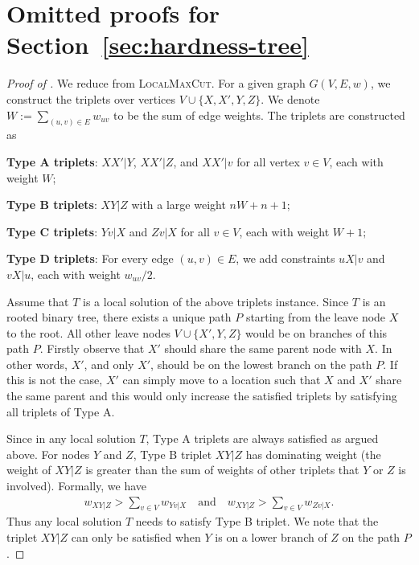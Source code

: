 \documentclass{article}
\theoremstyle{definition}  %
\theoremstyle{plain}
\numberwithin{observation}{section}
\numberwithin{claim}{section}
\numberwithin{fact}{section}
\numberwithin{lemma}{section}
\numberwithin{proposition}{section}
\numberwithin{theorem}{section}
\numberwithin{corollary}{section}
\numberwithin{definition}{section}
\newcommand{\Triplets}{\textsc{Local Triplets}}
\theoremstyle{plain}
\begin{document}
\section{Omitted proofs for Section~\ref{sec:hardness-tree}} \label{sec:proof_hardness_tree}
\begin{proof}[Proof of ]


We reduce from \textsc{LocalMaxCut}. For a given graph $G(V, E, w)$, we construct the triplets over vertices $V \cup \{X, X', Y, Z\}$. We denote $W := \sum_{(u,v) \in E} w_{uv}$ to be the sum of edge weights. The triplets are constructed as

\textbf{Type A triplets}: $XX'|Y$, $XX'|Z$, and $XX'|v$ for all vertex $v \in V$, each with weight $W$;
\item \textbf{Type B triplets}: $XY|Z$ with a large weight $nW + n + 1$;
\item \textbf{Type C triplets}: $Yv|X$ and $Zv|X$ for all $v \in V$, each with weight $W + 1;$
\item \textbf{Type D triplets}: For every edge $(u, v) \in E$, we add constraints $uX|v$ and $vX|u$, each with weight $w_{uv}/2$.

Assume that $T$ is a local solution of the above triplets instance. Since $T$ is an rooted binary tree, there exists a unique path $P$ starting from the leave node $X$ to the root. All other leave nodes $V \cup \{X', Y, Z\}$ would be on branches of this path $P$. Firstly observe that $X'$ should share the same parent node with $X$. In other words, $X'$, and only $X'$, should be on the lowest branch on the path $P$. If this is not the case, $X'$ can simply move to a location such that $X$ and $X'$ share the same parent and this would only increase the satisfied triplets by satisfying all triplets of Type A.

Since in any local solution $T$, Type A triplets are always satisfied as argued above. For nodes $Y$ and $Z$, Type B triplet $XY|Z$ has dominating weight (the weight of $XY|Z$ is greater than the sum of weights of other triplets that $Y$ or $Z$ is involved). Formally, we have
\begin{align*}
    w_{XY|Z} > \sum_{v \in V} w_{Yv|X} \quad \text{and} \quad w_{XY|Z} > \sum_{v \in V} w_{Zv|X}.
\end{align*}
Thus any local solution $T$ needs to satisfy Type B triplet. We note that the triplet $XY|Z$ can only be satisfied when $Y$ is on a lower branch of $Z$ on the path $P$. 


\end{proof}
\end{document}
